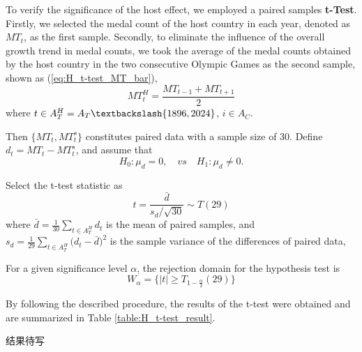 \documentclass{mcmthesis}
\begin{document}

To verify the significance of the host effect, we employed a paired samples \textbf{t-Test}. Firstly, we selected the medal count of the host country in each year, denoted as $MT_{t}$, as the first sample. Secondly, to eliminate the influence of the overall growth trend in medal counts, we took the average of the medal counts obtained by the host country in the two consecutive Olympic Games as the second sample, shown as (\ref{eq:H_t-test_MT_bar}),
\begin{equation}
MT^H_{t}=\frac{ MT_{t-1} + MT_{t+1} }{2}
\label{eq:H_t-test_MT_bar}
\end{equation}
where $t\in A_T^H = A_T \textbackslash \{1896,2024\}$, $i\in A_{C}$. 

Then $\{MT_{t},MT^s_{t}\}$ constitutes paired data with a sample size of 30. Define $d_t= MT_{t} - MT^s_{t}$, and assume that
\begin{equation*}
H_0: \mu_d=0, \quad vs \quad H_1:  \mu_d \ne 0.
\end{equation*}

Select the t-test statistic as
\begin{equation}
t=\frac{ \bar{d} }{ s_d\slash \sqrt{30} } \sim T(29)
\end{equation}
where $\bar{d}=\frac{1}{30} \sum_{t\in A_T^H} d_t$ is the mean of paired samples, 
and $ s_d = \frac{1}{29} \sum_{t\in A_T^H}\big( d_t - \bar{d} \big)^2 $ is the sample variance of the differences of paired data, 

For a given significance level $\alpha$, the rejection domain for the hypothesis test is
\begin{equation}
W_\alpha = \big\{ |t| \ge T_{1-\frac{\alpha}{2}}(29) \big\}
\end{equation}

By following the described procedure, the results of the t-test were obtained and are summarized in Table \ref{table:H_t-test_result}.

结果待写
\end{document}

